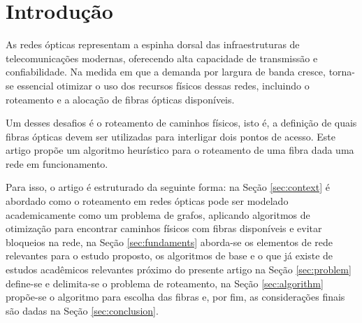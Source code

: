 \section{Introdução}

As redes ópticas representam a espinha dorsal das infraestruturas de
telecomunicações modernas, oferecendo alta capacidade de transmissão e
confiabilidade. Na medida em que a demanda por largura de banda cresce,
torna-se essencial otimizar o uso dos recursos físicos dessas redes, incluindo
o roteamento e a alocação de fibras ópticas disponíveis.

Um desses desafios é o roteamento de caminhos físicos, isto é, a definição de
quais fibras ópticas devem ser utilizadas para interligar dois pontos de
acesso. Este artigo propõe um algoritmo heurístico para o roteamento de uma
fibra dada uma rede em funcionamento.

Para isso, o artigo é estruturado da seguinte forma: na Seção \ref{sec:context}
é abordado como o roteamento em redes ópticas pode ser modelado academicamente
como um problema de grafos, aplicando algoritmos de otimização para encontrar
caminhos físicos com fibras disponíveis e evitar bloqueios na rede, na Seção
\ref{sec:fundaments} aborda-se os elementos de rede relevantes para o estudo
proposto, os algoritmos de base e o que já existe de estudos acadêmicos
relevantes próximo do presente artigo na Seção \ref{sec:problem} define-se e
delimita-se o problema de roteamento, na Seção \ref{sec:algorithm} propõe-se o
algoritmo para escolha das fibras e, por fim, as considerações finais são dadas
na Seção \ref{sec:conclusion}.

